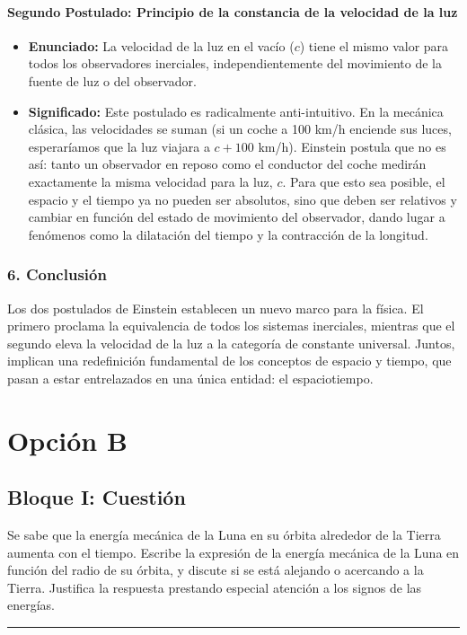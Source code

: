 \paragraph*{Segundo Postulado: Principio de la constancia de la velocidad de la luz}
\begin{itemize}
    \item \textbf{Enunciado:} La velocidad de la luz en el vacío ($c$) tiene el mismo valor para todos los observadores inerciales, independientemente del movimiento de la fuente de luz o del observador.
    \item \textbf{Significado:} Este postulado es radicalmente anti-intuitivo. En la mecánica clásica, las velocidades se suman (si un coche a 100 km/h enciende sus luces, esperaríamos que la luz viajara a $c + 100$ km/h). Einstein postula que no es así: tanto un observador en reposo como el conductor del coche medirán exactamente la misma velocidad para la luz, $c$. Para que esto sea posible, el espacio y el tiempo ya no pueden ser absolutos, sino que deben ser relativos y cambiar en función del estado de movimiento del observador, dando lugar a fenómenos como la dilatación del tiempo y la contracción de la longitud.
\end{itemize}

\subsubsection*{6. Conclusión}
\begin{cajaconclusion}
Los dos postulados de Einstein establecen un nuevo marco para la física. El primero proclama la equivalencia de todos los sistemas inerciales, mientras que el segundo eleva la velocidad de la luz a la categoría de constante universal. Juntos, implican una redefinición fundamental de los conceptos de espacio y tiempo, que pasan a estar entrelazados en una única entidad: el espaciotiempo.
\end{cajaconclusion}

\newpage

\section{Opción B}
\label{sec:B_2012_jun_ord}

\subsection{Bloque I: Cuestión}
\label{subsec:B1_2012_jun_ord}
\begin{cajaenunciado}
Se sabe que la energía mecánica de la Luna en su órbita alrededor de la Tierra aumenta con el tiempo. Escribe la expresión de la energía mecánica de la Luna en función del radio de su órbita, y discute si se está alejando o acercando a la Tierra. Justifica la respuesta prestando especial atención a los signos de las energías.
\end{cajaenunciado}
\hrule


